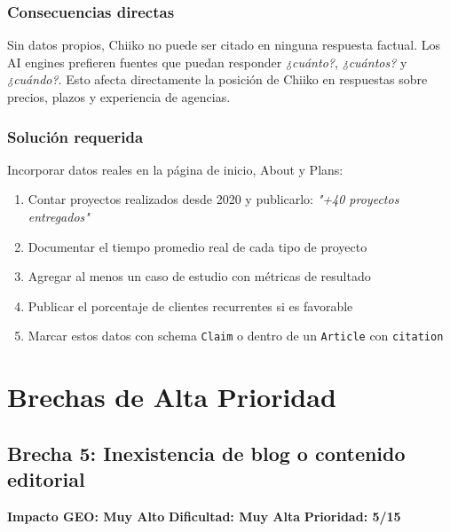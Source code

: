 \documentclass[12pt, a4paper]{article}
\begin{document}
\subsubsection{Consecuencias directas}

Sin datos propios, Chiiko no puede ser citado en ninguna respuesta factual. Los AI engines prefieren fuentes que puedan responder \textit{¿cuánto?}, \textit{¿cuántos?} y \textit{¿cuándo?}. Esto afecta directamente la posición de Chiiko en respuestas sobre precios, plazos y experiencia de agencias.

\subsubsection{Solución requerida}

Incorporar datos reales en la página de inicio, About y Plans:
\begin{enumerate}[itemsep=4pt]
  \item Contar proyectos realizados desde 2020 y publicarlo: \textit{"+40 proyectos entregados"}
  \item Documentar el tiempo promedio real de cada tipo de proyecto
  \item Agregar al menos un caso de estudio con métricas de resultado
  \item Publicar el porcentaje de clientes recurrentes si es favorable
  \item Marcar estos datos con schema \texttt{Claim} o dentro de un \texttt{Article} con \texttt{citation}
\end{enumerate}

\newpage

\section{Brechas de Alta Prioridad}

\subsection{Brecha 5: Inexistencia de blog o contenido editorial}

\begin{highbox}
\textbf{Impacto GEO: Muy Alto} \quad \textbf{Dificultad: Muy Alta} \quad \textbf{Prioridad: 5/15}
\end{highbox}
\end{document}

